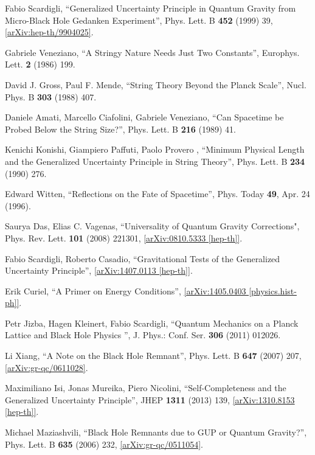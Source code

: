 \documentclass[12pt]{article}
\newcommand{\2}{$^2$}
\newcommand{\3}{$^3$}
\newcommand{\4}{$_4$}
\newcommand{\5}{$_5$}
\begin{document}
\begin{thebibliography}{400}
 Fabio Scardigli, ``Generalized Uncertainty Principle in Quantum Gravity from Micro-Black Hole Gedanken Experiment'', Phys. Lett. B \textbf{452} (1999) 39, \href{http://arxiv.org/abs/hep-th/9904025}{[arXiv:hep-th/9904025]}. 

 Gabriele Veneziano, ``A Stringy Nature Needs Just Two Constants'', Europhys. Lett. \textbf{2} (1986) 199. 

 David J. Gross, Paul F. Mende, ``String Theory Beyond the Planck Scale'', Nucl. Phys. B \textbf{303} (1988) 407.

 Daniele Amati, Marcello Ciafolini, Gabriele Veneziano, ``Can Spacetime be Probed Below the String Size?'', Phys. Lett. B \textbf{216} (1989) 41.

 Kenichi Konishi, Giampiero Paffuti, Paolo Provero , ``Minimum Physical Length and the Generalized Uncertainty Principle in String Theory'', Phys. Lett. B \textbf{234} (1990) 276.

 Edward Witten, ``Reflections on the Fate of Spacetime'', Phys. Today \textbf{49},  Apr. 24 (1996). 

 Saurya Das, Elias C. Vagenas, ``Universality of Quantum Gravity Corrections", Phys.
Rev. Lett. \textbf{101} (2008) 221301, \href{http://arxiv.org/abs/0810.5333}{[arXiv:0810.5333 [hep-th]]}.

Fabio Scardigli, Roberto Casadio, ``Gravitational Tests of the Generalized Uncertainty Principle'', \href{http://arxiv.org/abs/1407.0113}{[arXiv:1407.0113 [hep-th]]}.

Erik Curiel, ``A Primer on Energy Conditions'', \href{http://arxiv.org/abs/1405.0403}{[arXiv:1405.0403 [physics.hist-ph]]}.

Petr Jizba, Hagen Kleinert, Fabio Scardigli, ``Quantum Mechanics on a Planck Lattice and Black Hole Physics '', J. Phys.: Conf. Ser. \textbf{306} (2011) 012026.

Li Xiang, ``A Note on the Black Hole Remnant'', Phys. Lett. B \textbf{647} (2007) 207, \href{http://arxiv.org/abs/gr-qc/0611028}{[arXiv:gr-qc/0611028]}.

Maximiliano Isi, Jonas Mureika, Piero Nicolini, ``Self-Completeness and the Generalized Uncertainty Principle'', JHEP \textbf{1311} (2013) 139, \href{http://arxiv.org/abs/arXiv:1310.8153}{[arXiv:1310.8153 [hep-th]]}.


Michael Maziashvili, ``Black Hole Remnants due to GUP or Quantum Gravity?'', Phys. Lett. B \textbf{635} (2006) 232, \href{http://arxiv.org/abs/gr-qc/0511054}{[arXiv:gr-qc/0511054]}. 


\end{thebibliography}
\end{document}
